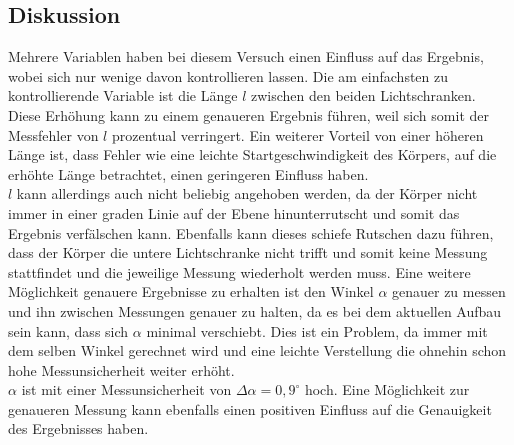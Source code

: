 \subsection{Diskussion} \label{chap:Diskussion}
Mehrere Variablen haben bei diesem Versuch einen Einfluss auf das Ergebnis, wobei sich nur wenige davon kontrollieren lassen. Die am einfachsten zu kontrollierende Variable ist die Länge $l$ zwischen den beiden Lichtschranken.
\\
Diese Erhöhung kann zu einem genaueren Ergebnis führen, weil sich somit der Messfehler von $l$ prozentual verringert. Ein weiterer Vorteil von einer höheren Länge ist, dass Fehler wie eine leichte Startgeschwindigkeit des Körpers, auf die erhöhte Länge betrachtet, einen geringeren Einfluss haben. \\ $l$ kann allerdings auch nicht beliebig angehoben werden, da der Körper nicht immer in einer graden Linie auf der Ebene hinunterrutscht und somit das Ergebnis verfälschen kann. Ebenfalls kann dieses schiefe Rutschen dazu führen, dass der Körper die untere Lichtschranke nicht trifft und somit keine Messung stattfindet und die jeweilige Messung wiederholt werden muss.\bigbreak 
Eine weitere Möglichkeit genauere Ergebnisse zu erhalten ist den Winkel $\alpha$ genauer zu messen und ihn zwischen Messungen genauer zu halten, da es bei dem aktuellen Aufbau sein kann, dass sich $\alpha$ minimal verschiebt. Dies ist ein Problem, da immer mit dem selben Winkel gerechnet wird und eine leichte Verstellung die ohnehin schon hohe Messunsicherheit weiter erhöht. \\ 
$\alpha$ ist mit einer Messunsicherheit von $\Delta \alpha = 0,9^\circ$ hoch. Eine Möglichkeit zur genaueren Messung kann ebenfalls einen positiven Einfluss auf die Genauigkeit des Ergebnisses haben.